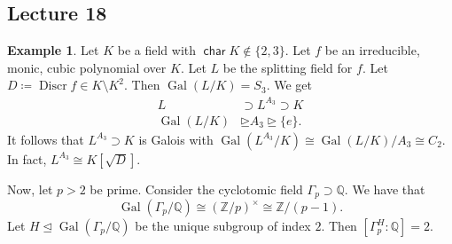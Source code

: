 \documentclass[10pt,letterpaper,cm]{nupset}
\theoremstyle{definition}
\newtheorem{exmp}[definition]{Example}
\theoremstyle{theorem}
\theoremstyle{remark}
\newcommand{\Q}{\mathbb Q}
\newcommand{\Z}{\mathbb Z}
\newcommand{\1}{\mathbf{1}}
\newcommand{\0}{\vec 0}
\DeclareMathOperator{\Char}{\mathsf{char}}
\DeclareMathOperator{\gal}{Gal}
\DeclareMathOperator{\disc}{Discr}
\begin{document}
\subsection{Lecture 18}

\begin{exmp}
Let $K$ be a field with $\Char{K} \notin \{2,3\}$. Let $f$ be an irreducible, monic, cubic polynomial over $K$. Let $L$ be the splitting field for $f$. Let $D\coloneqq  \disc{f} \in K \setminus K^2$. Then $\gal(L/K) = S_3$. We get
\begin{align*} L & \supset L^{A_3} \supset K  \\   \gal(L/K)  & \unrhd A_3 \unrhd \{e\}  . \end{align*} It follows that $L^{A_3}\supset K$ is Galois with $\gal(L^{A_3}/K) \cong \gal(L/K)/A_3 \cong C_2$. In fact, $L^{A_3} \cong K\left[\sqrt{D}\right]$.
\end{exmp}

\smallskip

Now, let $p>2$ be prime. Consider the cyclotomic field $\Gamma_p \supset \Q$. We have that $$   \gal(\Gamma_p/\Q) \cong (\Z/p)^{\times} \cong \Z/(p-1) .$$ Let $H \unlhd \gal(\Gamma_p/\Q)$ be the unique subgroup of index $2$. Then $\left[\Gamma_p^H :\Q\right] =2$.
\end{document}

